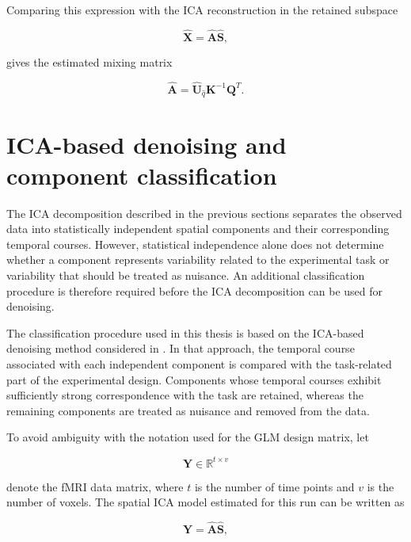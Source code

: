 \documentclass[english]{pwr_wmat_praca_dyplomowa}
\theoremstyle{definition}
\theoremstyle{remark}
\begin{document}
Comparing this expression with the ICA reconstruction in the retained subspace

\begin{equation}
    \widehat{\mathbf{X}} = \widehat{\mathbf{A}}\widehat{\mathbf{S}},
\end{equation}

gives the estimated mixing matrix

\begin{equation}
    \widehat{\mathbf{A}} = \widehat{\mathbf{U}}_{\widehat{q}}\mathbf{K}^{-1}\mathbf{Q}^T.
\end{equation}


\section{ICA-based denoising and component classification}
\label{section:ica-denoising}

The ICA decomposition described in the previous sections separates the observed data into statistically independent spatial components and their corresponding temporal courses. However, statistical independence alone does not determine whether a component represents variability related to the experimental task or variability that should be treated as nuisance. An additional classification procedure is therefore required before the ICA decomposition can be used for denoising.

The classification procedure used in this thesis is based on the ICA-based denoising method considered in \cite{glm-denoise}. In that approach, the temporal course associated with each independent component is compared with the task-related part of the experimental design. Components whose temporal courses exhibit sufficiently strong correspondence with the task are retained, whereas the remaining components are treated as nuisance and removed from the data.

To avoid ambiguity with the notation used for the GLM design matrix, let

\begin{equation}
    \mathbf{Y} \in \mathbb{R}^{t \times v}
\end{equation}

denote the fMRI data matrix, where $t$ is the number of time points and $v$ is the number of voxels. The spatial ICA model estimated for this run can be written as

\begin{equation}
    \mathbf{Y} = \widehat{\mathbf{A}} \widehat{\mathbf{S}},
\end{equation}
\end{document}
